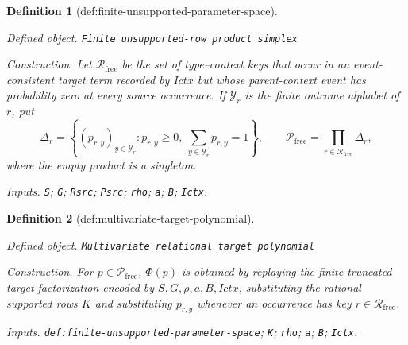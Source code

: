 \documentclass{article}
\newtheorem{definition}{Definition}
\begin{document}
\begin{definition}[def:finite-unsupported-parameter-space]\label{def:finite-unsupported-parameter-space}
\par\smallskip\noindent\emph{Defined object.} \texttt{Finite unsupported-\allowbreak{}row product simplex}
\par\smallskip\noindent\emph{Construction.} Let \(\mathcal R_{\mathrm{free}}\) be the set of type--context keys that occur in an event-consistent target term recorded by \(Ictx\) but whose parent-context event has probability zero at every source occurrence.  If \(\mathcal Y_r\) is the finite outcome alphabet of \(r\), put
\[
 \Delta_r=\left\{(p_{r,y})_{y\in\mathcal Y_r}:p_{r,y}\geq0,\ \sum_{y\in\mathcal Y_r}p_{r,y}=1\right\},
 \qquad
 \mathcal P_{\mathrm{free}}=\prod_{r\in\mathcal R_{\mathrm{free}}}\Delta_r,
\]
where the empty product is a singleton.
\par\smallskip\noindent\emph{Inputs.} \texttt{S}; \texttt{G}; \texttt{Rsrc}; \texttt{Psrc}; \texttt{rho}; \texttt{a}; \texttt{B}; \texttt{Ictx}.
\end{definition}

\begin{definition}[def:multivariate-target-polynomial]\label{def:multivariate-target-polynomial}
\par\smallskip\noindent\emph{Defined object.} \texttt{Multivariate relational target polynomial}
\par\smallskip\noindent\emph{Construction.} For \(p\in\mathcal P_{\mathrm{free}}\), \(\Phi(p)\) is obtained by replaying the finite truncated target factorization encoded by \(S,G,\rho,a,B,Ictx\), substituting the rational supported rows \(K\) and substituting \(p_{r,y}\) whenever an occurrence has key \(r\in\mathcal R_{\mathrm{free}}\).
\par\smallskip\noindent\emph{Inputs.} \texttt{def:\allowbreak{}finite-\allowbreak{}unsupported-\allowbreak{}parameter-\allowbreak{}space}; \texttt{K}; \texttt{rho}; \texttt{a}; \texttt{B}; \texttt{Ictx}.
\end{definition}
\end{document}
